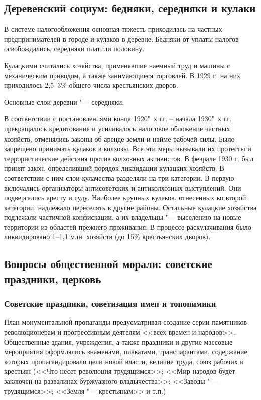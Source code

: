 \subsection{Деревенский социум: бедняки, середняки и кулаки}

В системе налогообложения основная тяжесть приходилась на частных предпринимателей в городе и кулаков в деревне. Бедняки от уплаты налогов освобождались, середняки платили половину.

Кулацкими считались хозяйства, применявшие наемный труд и машины с механическим приводом, а также занимающиеся торговлей. В 1929 г. на них приходилось 2,5--3\% общего числа крестьянских дворов.

Основные слои деревни "--- середняки.

В соответствии с постановлениями конца 1920"~х гг. -- начала 1930"~х гг. прекращалось кредитование и усиливалось налоговое обложение частных хозяйств, отменялись законы об аренде земли и найме рабочей силы. Было запрещено принимать кулаков в колхозы. Все эти меры вызывали их протесты и террористические действия против колхозных активистов. В феврале 1930 г. был принят закон, определивший порядок ликвидации кулацких хозяйств. В соответствии с ним слои кулачества разделяли на три категории. В первую включались организаторы антисоветских и антиколхозных выступлений. Они подвергались аресту и суду. Наиболее крупных кулаков, отнесенных ко второй категории, надлежало переселять в другие районы. Остальные кулацкие хозяйства подлежали частичной конфискации, а их владельцы "--- выселению на новые территории из областей прежнего проживания. В процессе раскулачивания было ликвидировано 1--1,1 млн. хозяйств (до 15\% крестьянских дворов).

\subsection{Вопросы общественной морали: советские праздники, церковь}

\subsubsection{\textbf{Советские праздники, советизация имен и топонимики}}

План монументальной пропаганды предусматривал создание серии памятников революционерам и прогрессивным деятелям <<всех времен и народов>>. Общественные здания, учреждения, а также праздники и другие массовые мероприятия оформлялись знаменами, плакатами, транспарантами, содержание которых пропагандировало цели новой власти, величие труда, союз рабочих и крестьян (<<Что несет революция трудящимся>>; <<Мир народов будет заключен на развалинах буржуазного владычества>>; <<Заводы "--- трудящимся>>; <<Земля "--- крестьянам>> и т.п.)

